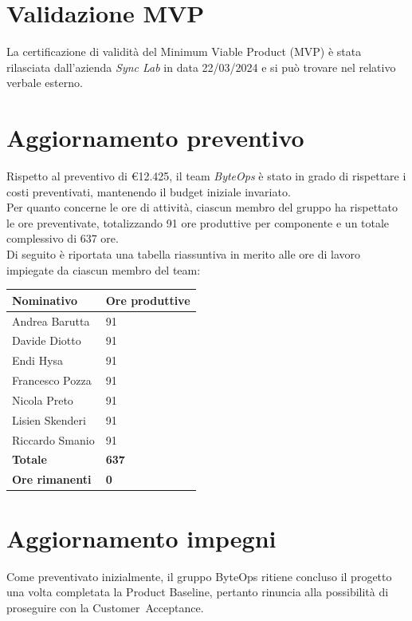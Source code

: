 \documentclass{article}
\begin{document}
\section{Validazione MVP}

La certificazione di validità del Minimum Viable Product (MVP) è stata rilasciata dall'azienda \textit{Sync Lab} in data 22/03/2024 e si può trovare nel relativo verbale esterno.

\section{Aggiornamento preventivo}
Rispetto al preventivo di €12.425, il team \textit{ByteOps} è stato in grado di rispettare i costi preventivati, mantenendo il budget iniziale invariato. \\
Per quanto concerne le ore di attività, ciascun membro del gruppo ha rispettato le ore preventivate, totalizzando 91 ore produttive per componente e un totale complessivo di 637 ore.\\
Di seguito è riportata una tabella riassuntiva in merito alle ore di lavoro impiegate da ciascun membro del team:
\begin{center}
    \begin{tabular}{|C{4cm}|C{2cm}|}
    \hline
        \textbf{Nominativo} & \textbf{Ore produttive} \\
        \hline\hline
        Andrea Barutta  & 91 \\
        \hline
        Davide Diotto   & 91 \\ 
        \hline
        Endi Hysa       & 91 \\ 
        \hline
        Francesco Pozza & 91 \\ 
        \hline
        Nicola Preto    & 91 \\ 
        \hline
        Lisien Skenderi & 91 \\ 
        \hline
        Riccardo Smanio & 91 \\ 
        \hline\hline
        \textbf{Totale} & \textbf{637} \\ 
        \hline
        \textbf{Ore rimanenti} & \textbf{0} \\
        \hline
    \end{tabular}
\end{center}

\section{Aggiornamento impegni}
Come preventivato inizialmente, il gruppo ByteOps ritiene concluso il progetto una volta completata la Product Baseline, pertanto rinuncia alla possibilità di proseguire con la Customer Acceptance.
\end{document}
